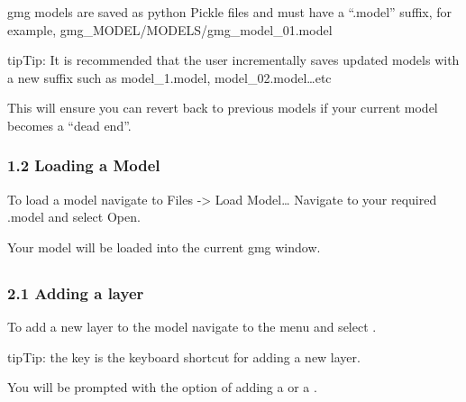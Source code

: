 \documentclass[a4paper,10pt,english]{sphinxmanual}
\begin{document}
gmg models are saved as python Pickle files and must have a “.model” suffix, for example,
gmg\_MODEL/MODELS/gmg\_model\_01.model

\begin{sphinxadmonition}{tip}{Tip:}
It is recommended that the user incrementally saves updated models with a new suffix such as model\_1.model,
model\_02.model…etc
\end{sphinxadmonition}

This will ensure you can revert back to previous models if your current model becomes a “dead end”.

\begin{DUlineblock}{0em}
\item[] 
\end{DUlineblock}


\subsubsection{1.2 Loading a Model}
\label{\detokenize{manual_models:loading-a-model}}
To load a model navigate to Files -\textgreater{} Load Model…
Navigate to your required .model and select Open.

Your model will be loaded into the current gmg window.


\subsection{}
\label{\detokenize{manual_layer_nodes:model-layers}}\label{\detokenize{manual_layer_nodes::doc}}
\begin{DUlineblock}{0em}
\item[] 
\end{DUlineblock}


\subsubsection{2.1 Adding a layer}
\label{\detokenize{manual_layer_nodes:adding-a-layer}}
To add a new layer to the model navigate to the  menu and select .

\begin{sphinxadmonition}{tip}{Tip:}
the  key is the keyboard shortcut for adding a new layer.
\end{sphinxadmonition}

You will be prompted with the option of adding a  or a .
\end{document}
